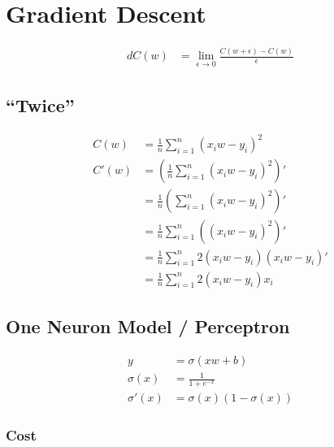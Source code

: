 \documentclass{article}
\begin{document}
\section{Gradient Descent}
\begin{align}
    dC(w) & = \lim_{\epsilon \to 0}\frac{C(w + \epsilon) - C(w)}{\epsilon}
\end{align}

\subsection{``Twice''}
\begin{align}
    C(w) & = \frac{1}{n}\sum_{i=1}^{n}(x_iw - y_i)^2                        \\
    C'(w)
         & = \left(\frac{1}{n}\sum_{i=1}^{n}(x_iw - y_i)^2\right)'          \\
         & = \frac{1}{n}\left(\sum_{i=1}^{n}(x_iw - y_i)^2\right)'          \\
         & = \frac{1}{n}\sum_{i=1}^{n}\left((x_iw - y_i)^2\right)'          \\
         & = \frac{1}{n}\sum_{i=1}^{n}2(x_iw - y_i)\left(x_iw - y_i\right)' \\
         & = \frac{1}{n}\sum_{i=1}^{n}2(x_iw - y_i)x_i
\end{align}

\subsection{One Neuron Model / Perceptron}

\def\d{2}

\begin{center}
\end{center}

\begin{align}
    y          & = \sigma(xw + b)             \\
    \sigma(x)  & = \frac{1}{1 + e^{-x}}       \\
    \sigma'(x) & =  \sigma(x) (1 - \sigma(x))
\end{align}

\subsubsection{Cost}
\end{document}
